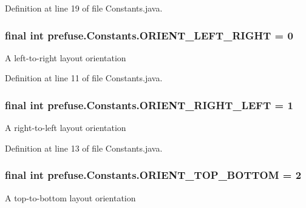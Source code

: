 \-Definition at line 19 of file \-Constants.\-java.

\hypertarget{interfaceprefuse_1_1_constants_a6d23eaeac806f6151addc8a744c28823}{
\subsubsection[{\-O\-R\-I\-E\-N\-T\-\_\-\-L\-E\-F\-T\-\_\-\-R\-I\-G\-H\-T}]{\setlength{\rightskip}{0pt plus 5cm}final int {\bf prefuse.\-Constants.\-O\-R\-I\-E\-N\-T\-\_\-\-L\-E\-F\-T\-\_\-\-R\-I\-G\-H\-T} = 0}}\label{interfaceprefuse_1_1_constants_a6d23eaeac806f6151addc8a744c28823}
\-A left-\/to-\/right layout orientation 

\-Definition at line 11 of file \-Constants.\-java.

\hypertarget{interfaceprefuse_1_1_constants_a9885120ea5c227c5b1cf2f3a79d7b347}{
\subsubsection[{\-O\-R\-I\-E\-N\-T\-\_\-\-R\-I\-G\-H\-T\-\_\-\-L\-E\-F\-T}]{\setlength{\rightskip}{0pt plus 5cm}final int {\bf prefuse.\-Constants.\-O\-R\-I\-E\-N\-T\-\_\-\-R\-I\-G\-H\-T\-\_\-\-L\-E\-F\-T} = 1}}\label{interfaceprefuse_1_1_constants_a9885120ea5c227c5b1cf2f3a79d7b347}
\-A right-\/to-\/left layout orientation 

\-Definition at line 13 of file \-Constants.\-java.

\hypertarget{interfaceprefuse_1_1_constants_a2ff3bde1eaeac5a297811834137989d7}{
\subsubsection[{\-O\-R\-I\-E\-N\-T\-\_\-\-T\-O\-P\-\_\-\-B\-O\-T\-T\-O\-M}]{\setlength{\rightskip}{0pt plus 5cm}final int {\bf prefuse.\-Constants.\-O\-R\-I\-E\-N\-T\-\_\-\-T\-O\-P\-\_\-\-B\-O\-T\-T\-O\-M} = 2}}\label{interfaceprefuse_1_1_constants_a2ff3bde1eaeac5a297811834137989d7}
\-A top-\/to-\/bottom layout orientation 

